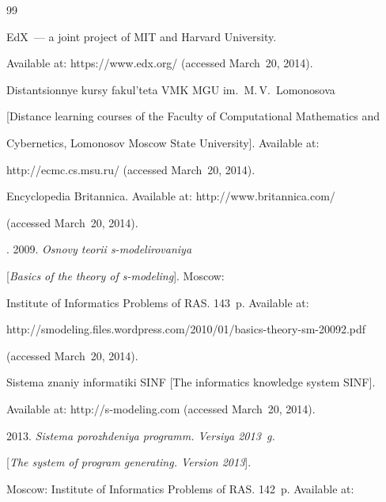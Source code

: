  {\small\frenchspacing


{\baselineskip=11pt




\begin{thebibliography}{99}










EdX~--- a joint project of MIT and Harvard University.


Available at: {\sf https://www.edx.org/}  (accessed March~20, 2014).




Distantsionnye kursy fakul'teta VMK MGU im.\ M.\,V.~Lomonosova


[Distance learning courses of the Faculty of Computational Mathematics and


Cybernetics, Lomonosov Moscow State University]. Available at:


{\sf http://ecmc.cs.msu.ru/} (accessed March~20, 2014).




Encyclopedia Britannica. Available at: {\sf http://www.britannica.com/}


(accessed March~20, 2014).




. 2009. \textit{Osnovy teorii s-modelirovaniya}


[\textit{Basics of the theory of s-modeling}]. Moscow:


Institute of Informatics Problems of RAS. 143~p. Available at:


{\sf http://smodeling.files.wordpress.com/2010/01/basics-theory-sm-20092.pdf}


(accessed March~20, 2014).




Sistema znaniy informatiki SINF [The informatics knowledge system SINF].


Available at: {\sf http://s-modeling.com} (accessed March~20, 2014).




 2013. \textit{Sistema porozhdeniya programm. Versiya 2013~g.}


[\textit{The system of program generating. Version 2013}].


Moscow: Institute of Informatics Problems of RAS. 142~p. Available at:



\end{thebibliography}}}
